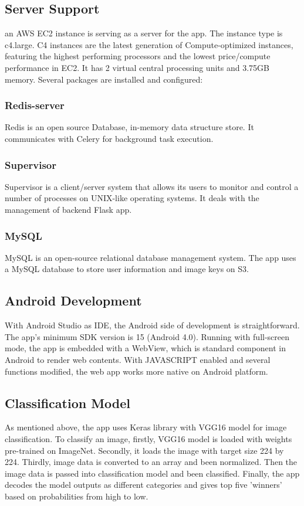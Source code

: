 \documentclass[conference]{IEEEtran}
\begin{document}
\subsection{Server Support}
an AWS EC2 instance is serving as a server for the app. The instance type is c4.large. C4 instances are the latest generation of Compute-optimized instances, featuring the highest performing processors and the lowest price/compute performance in EC2. It has 2 virtual central processing units and 3.75GB memory. Several packages are installed and configured:

\subsubsection{Redis-server}
Redis is an open source Database, in-memory data structure store. It communicates with Celery for background task execution.

\subsubsection{Supervisor}
Supervisor is a client/server system that allows its users to monitor and control a number of processes on UNIX-like operating systems. It deals with the management of backend Flask app.

\subsubsection{MySQL}
MySQL is an open-source relational database management system. The app uses a MySQL database to store user information and image keys on S3.

\subsection{Android Development}
With Android Studio as IDE, the Android side of development is straightforward. The app's minimum SDK version is 15 (Android 4.0). Running with full-screen mode, the app is embedded with a WebView, which is standard component in Android to render web contents. With JAVASCRIPT enabled and several functions modified, the web app works more native on Android platform.

\subsection{Classification Model}
As mentioned above, the app uses Keras library with VGG16 model for image classification. To classify an image, firstly, VGG16 model is loaded with weights pre-trained on ImageNet. Secondly, it loads the image with target size 224 by 224. Thirdly, image data is converted to an array and been normalized. Then the image data is passed into classification model and been classified. Finally, the app decodes the model outputs as different categories and gives top five 'winners' based on probabilities from high to low.
\end{document}
